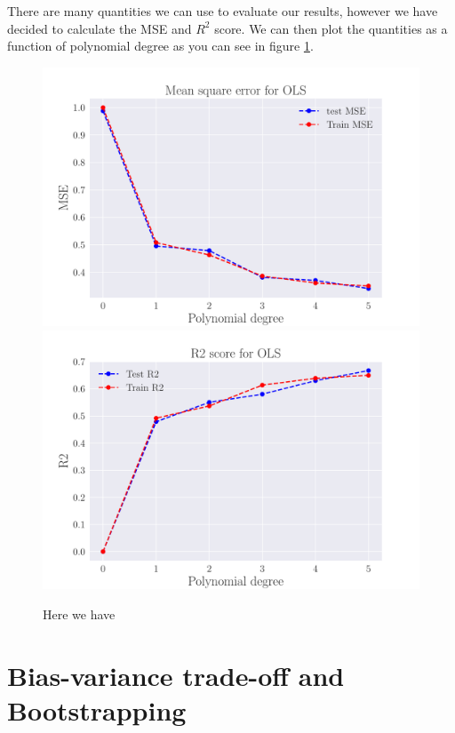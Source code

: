 \documentclass[reprint,english,notitlepage,aps,nobalancelastpage,nofootinbib]{revtex4-1}  %
\begin{document}
There are many quantities we can use to evaluate our results, however we have decided to calculate the MSE and $R^2$ score. We can then plot the quantities as a function of polynomial degree as you can see in figure \ref{fig:OLS_R2_and_MSE}.
\begin{figure}
	\includegraphics[width=\linewidth]{MSE_OLS_n100_eps0_2_pol5.pdf}
	\endminipage\hfill
	\includegraphics[width=\linewidth]{R2_OLS_n100_eps0_2_pol5.pdf}
	\endminipage
	\caption{Here we have }\label{fig:OLS_R2_and_MSE}
\end{figure}

\section{Bias-variance trade-off and Bootstrapping}
\end{document}
